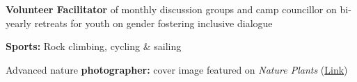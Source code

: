 \documentclass[a4paper,10pt]{article}
\begin{document}
\begin{description}
  \raggedright
  \item \textbf{Volunteer Facilitator} of monthly discussion groups and camp councillor on bi-yearly retreats for youth on gender fostering inclusive dialogue
  \item \textbf{Sports:} Rock climbing, cycling \& sailing
  \item Advanced nature \textbf{photographer:} cover image featured on \emph{Nature Plants} (\href{https://lauralwd.github.io/photography/}{Link})
\end{description}
\end{document}
